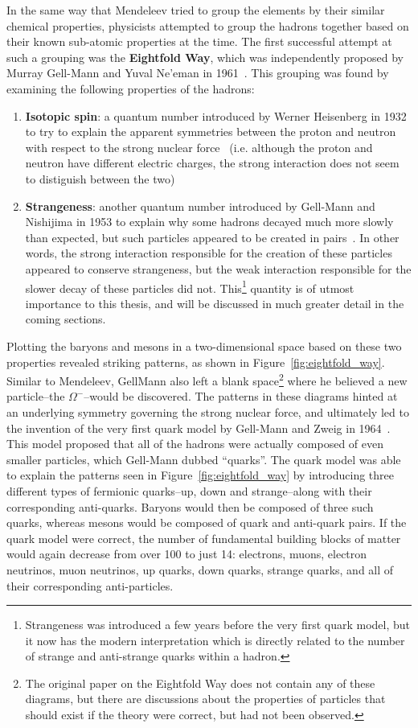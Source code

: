In the same way that Mendeleev tried to group the elements by their similar chemical properties, physicists attempted to group the hadrons together based on their known sub-atomic properties at the time. The first successful attempt at such a grouping was the \textbf{Eightfold Way}, which was independently proposed by Murray Gell-Mann and Yuval Ne'eman in 1961~\cite{GellMann, Neeman}. This grouping was found by examining the following properties of the hadrons:
%
\begin{enumerate}
    \item \textbf{Isotopic spin}: a quantum number introduced by Werner Heisenberg in 1932 to try to explain the apparent symmetries between the proton and neutron with respect to the strong nuclear force~\cite{IsotopicSpin} (i.e. although the proton and neutron have different electric charges, the strong interaction does not seem to distiguish between the two)
    \item \textbf{Strangeness}: another quantum number introduced by Gell-Mann and Nishijima in 1953 to explain why some hadrons decayed much more slowly than expected, but such particles appeared to be created in pairs~\cite{Strangeness}. In other words, the strong interaction responsible for the creation of these particles appeared to conserve strangeness, but the weak interaction responsible for the slower decay of these particles did not. This\footnote{Strangeness was introduced a few years before the very first quark model, but it now has the modern interpretation which is directly related to the number of strange and anti-strange quarks within a hadron.} quantity is of utmost importance to this thesis, and will be discussed in much greater detail in the coming sections.
\end{enumerate}
%
Plotting the baryons and mesons in a two-dimensional space based on these two properties revealed striking patterns, as shown in Figure~\ref{fig:eightfold_way}. Similar to Mendeleev, GellMann also left a blank space\footnote{The original paper on the Eightfold Way does not contain any of these diagrams, but there are discussions about the properties of particles that should exist if the theory were correct, but had not been observed.} where he believed a new particle--the $\Omega^{-}$--would be discovered.  The patterns in these diagrams hinted at an underlying symmetry governing the strong nuclear force, and ultimately led to the invention of the very first quark model by Gell-Mann and Zweig in 1964~\cite{QuarkModel}. This model proposed that all of the hadrons were actually composed of even smaller particles, which Gell-Mann dubbed ``quarks''. The quark model was able to explain the patterns seen in Figure~\ref{fig:eightfold_way} by introducing three different types of fermionic quarks--up, down and strange--along with their corresponding anti-quarks. Baryons would then be composed of three such quarks, whereas mesons would be composed of quark and anti-quark pairs. If the quark model were correct, the number of fundamental building blocks of matter would again decrease from over 100 to just 14: electrons, muons, electron neutrinos, muon neutrinos, up quarks, down quarks, strange quarks, and all of their corresponding anti-particles.

